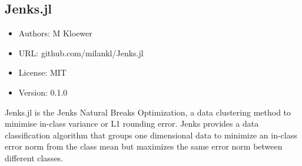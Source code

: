 \subsection{Jenks.jl}

\begin{itemize}
    \setlength\itemsep{-5pt}
    \item Authors: M Kloewer
    \item URL: github.com/milankl/Jenks.jl
    \item License: MIT
    \item Version: 0.1.0
\end{itemize}

Jenks.jl is the Jenks Natural Breaks Optimization, a data clustering method to minimise in-class variance or L1 rounding error. Jenks provides a data classification algorithm that groups one dimensional data to minimize an in-class error norm from the class mean but maximizes the same error norm between different classes.
